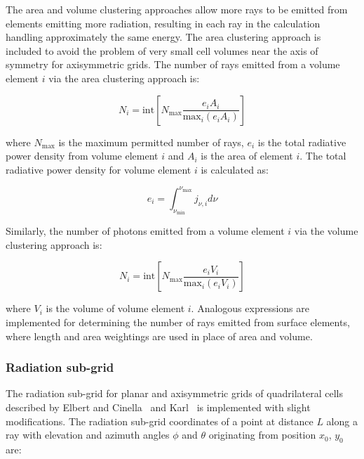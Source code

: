 \noindent The area and volume clustering approaches allow more rays to be emitted from elements emitting more radiation, resulting in each ray in the calculation handling approximately the same energy.
The area clustering approach is included to avoid the problem of very small cell volumes near the axis of symmetry for axisymmetric grids.
The number of rays emitted from a volume element $i$ via the area clustering approach is:

 \begin{equation}
 N_{i} = \text{int} \left [ N_{\text{max}} \frac{ e_{i} A_i }{ \text{max}_i ( e_{i} A_i ) } \right ] \label{eq:N_photons}
\end{equation}

\noindent where $N_{\text{max}}$ is the maximum permitted number of rays, $e_{i}$ is the total radiative power density from volume element $i$ and $A_i$ is the area of element $i$.
The total radiative power density for volume element $i$ is calculated as:

\begin{equation}
 e_i = \int_{\nu_{\text{min}}}^{\nu_{\text{max}}} j_{\nu,i} d \nu
\end{equation}

Similarly, the number of photons emitted from a volume element $i$ via the volume clustering approach is:

 \begin{equation}
 N_{i} = \text{int} \left [ N_{\text{max}} \frac{ e_{i} V_i }{ \text{max}_i ( e_{i} V_i ) } \right ] \label{eq:N_photons}
\end{equation}

\noindent where $V_i$ is the volume of volume element $i$.
Analogous expressions are implemented for determining the number of rays emitted from surface elements, where length and area weightings are used in place of area and volume.

\subsubsection{Radiation sub-grid}
\label{sec:radiation_subgrid}

The radiation sub-grid for planar and axisymmetric grids of quadrilateral cells described by Elbert and Cinella~\cite{elbert_cinnella} and Karl~\cite{karl2001} is implemented with slight modifications.
The radiation sub-grid coordinates of a point at distance $L$ along a ray with elevation and azimuth angles $\phi$ and $\theta$ originating from position $x_0$, $y_0$ are:

